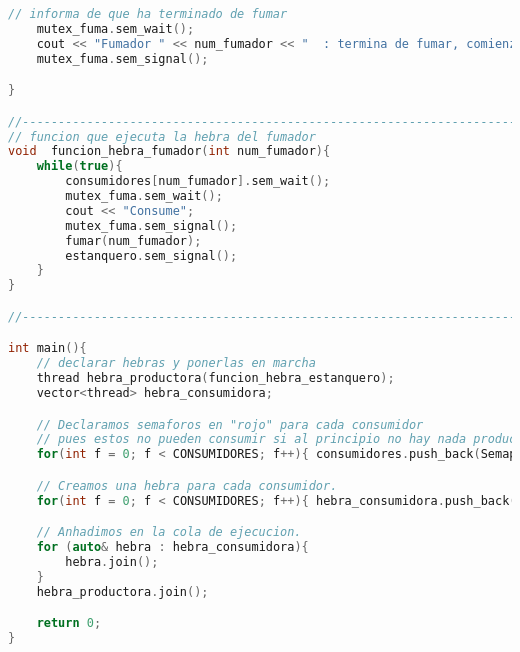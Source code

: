 \documentclass[8pt, a4paper, titlepage]{article}
\begin{document}
\begin{lstlisting}[language=C++]
	// informa de que ha terminado de fumar
	mutex_fuma.sem_wait();
	cout << "Fumador " << num_fumador << "  : termina de fumar, comienza espera de ingrediente." << endl;
	mutex_fuma.sem_signal();

}

//----------------------------------------------------------------------
// funcion que ejecuta la hebra del fumador
void  funcion_hebra_fumador(int num_fumador){
	while(true){
		consumidores[num_fumador].sem_wait();
		mutex_fuma.sem_wait();
		cout << "Consume";
		mutex_fuma.sem_signal();
		fumar(num_fumador);
		estanquero.sem_signal();
	}
}

//----------------------------------------------------------------------

int main(){
	// declarar hebras y ponerlas en marcha
	thread hebra_productora(funcion_hebra_estanquero);
	vector<thread> hebra_consumidora;

	// Declaramos semaforos en "rojo" para cada consumidor
	// pues estos no pueden consumir si al principio no hay nada producido.
	for(int f = 0; f < CONSUMIDORES; f++){ consumidores.push_back(Semaphore(0)); }

	// Creamos una hebra para cada consumidor.
	for(int f = 0; f < CONSUMIDORES; f++){ hebra_consumidora.push_back(thread(funcion_hebra_fumador, f)); }

	// Anhadimos en la cola de ejecucion.
	for (auto& hebra : hebra_consumidora){
		hebra.join();
	}
	hebra_productora.join();

	return 0;
}

\end{lstlisting}
\end{document}
